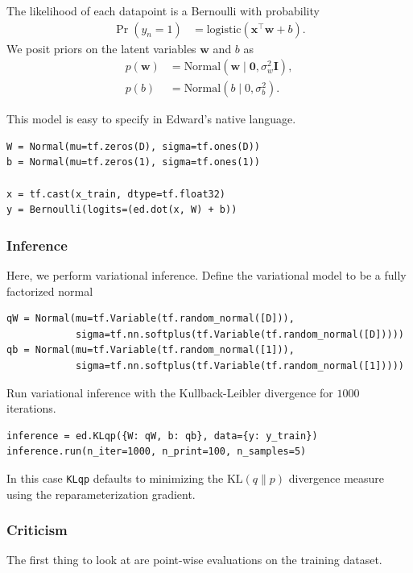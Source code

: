 The likelihood of each datapoint is a Bernoulli with probability
\begin{align*}
\Pr(y_n=1)
  &=
  \text{logistic}
  \left(
  \mathbf{x}^\top \mathbf{w} + b
  \right).
\end{align*}
We posit priors on the latent variables $\mathbf{w}$ and $b$ as
\begin{align*}
  p(\mathbf{w})
  &=
  \text{Normal}(\mathbf{w} \mid \mathbf{0}, \sigma_w^2\mathbf{I}),
  \\
  p(b)
  &=
  \text{Normal}(b \mid 0, \sigma_b^2).
\end{align*}

This model is
easy to specify in Edward's native language.

\begin{lstlisting}
W = Normal(mu=tf.zeros(D), sigma=tf.ones(D))
b = Normal(mu=tf.zeros(1), sigma=tf.ones(1))

x = tf.cast(x_train, dtype=tf.float32)
y = Bernoulli(logits=(ed.dot(x, W) + b))
\end{lstlisting}


\subsubsection{Inference}

Here, we perform variational inference. Define the variational model to be a
fully factorized normal
\begin{lstlisting}
qW = Normal(mu=tf.Variable(tf.random_normal([D])),
            sigma=tf.nn.softplus(tf.Variable(tf.random_normal([D]))))
qb = Normal(mu=tf.Variable(tf.random_normal([1])),
            sigma=tf.nn.softplus(tf.Variable(tf.random_normal([1]))))
\end{lstlisting}

Run variational inference with the Kullback-Leibler divergence for $1000$ iterations.
\begin{lstlisting}
inference = ed.KLqp({W: qW, b: qb}, data={y: y_train})
inference.run(n_iter=1000, n_print=100, n_samples=5)
\end{lstlisting}
In this case
\texttt{KLqp} defaults to minimizing the
$\text{KL}(q\|p)$ divergence measure using the reparameterization
gradient.


\subsubsection{Criticism}

The first thing to look at are point-wise evaluations on the training dataset.

